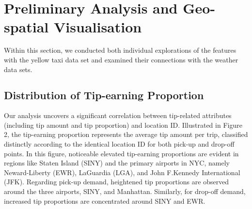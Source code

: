 \documentclass[11pt]{article}
\begin{document}
\section{Preliminary Analysis and Geo-spatial Visualisation}
Within this section, we conducted both individual explorations of the features with the yellow taxi data set and examined their connections with the weather data sets.
\subsection{Distribution of Tip-earning Proportion}
Our analysis uncovers a significant correlation between tip-related attributes (including tip amount and tip proportion) and location ID. Illustrated in Figure 2, the tip-earning proportion represents the average tip amount per trip, classified distinctly according to the identical location ID for both pick-up and drop-off points. In this figure, noticeable elevated tip-earning proportions are evident in regions like Staten Island (SINY) and the primary airports in NYC, namely Neward-Liberty (EWR), LaGuardia (LGA), and John F.Kennedy International (JFK). Regarding pick-up demand, heightened tip proportions are observed around the three airports, SINY, and Manhattan. Similarly, for drop-off demand, increased tip proportions are concentrated around SINY and EWR.
\end{document}
